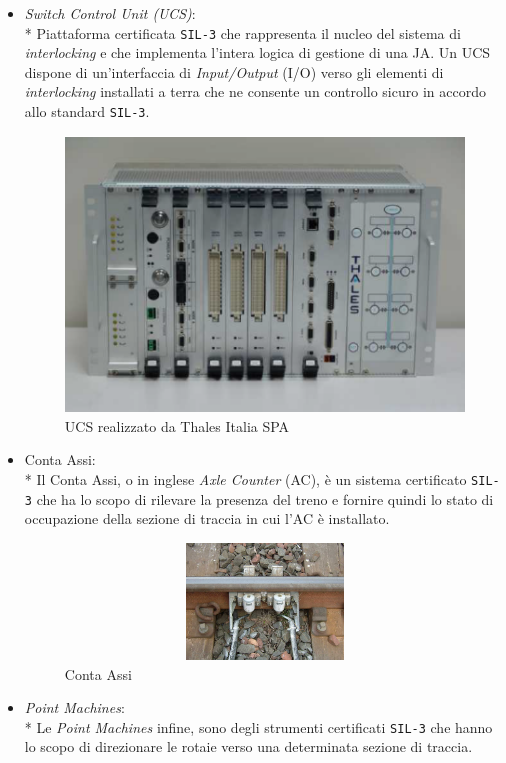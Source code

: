 \begin{itemize}
	\item \emph{Switch Control Unit (UCS)}:\\*
	Piattaforma certificata \texttt{SIL-3} che rappresenta il nucleo del sistema di \emph{interlocking} e che implementa l'intera logica di gestione di una JA. Un UCS dispone di un'interfaccia di \emph{Input/Output} (I/O) verso gli elementi di \emph{interlocking} installati a terra che ne consente un controllo sicuro in accordo allo standard \texttt{SIL-3}.
\begin{figure}[h]
		\centering
		\includegraphics[width=0.7\linewidth]{img/ucs}
		\caption{UCS realizzato da Thales Italia SPA}
		\label{fig:ucs}
\end{figure}
	\item Conta Assi:\\*
	Il Conta Assi, o in inglese \emph{Axle Counter} (AC), \`e un sistema certificato \texttt{SIL-3} che ha lo scopo di rilevare la presenza del treno e fornire quindi lo stato di occupazione della sezione di traccia in cui l'AC \`e installato.
\begin{figure}[h]
	\centering
	\includegraphics[width=11cm,height=3.1cm]{img/axlecounter}
	\caption{Conta Assi}
	\label{fig:ac}
\end{figure}
	\item \emph{Point Machines}:\\*
	Le \emph{Point Machines} infine, sono degli strumenti certificati \texttt{SIL-3} che hanno lo scopo di direzionare le rotaie verso una determinata sezione di traccia.
	\begin{figure}[h]

\end{figure}
\end{itemize}
